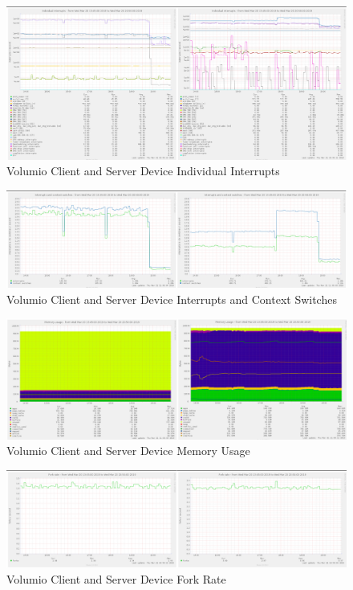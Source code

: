 \documentclass[11pt,a4paper,headinclude=false,footinclude=false]{scrreprt}
\begin{document}
\begin{figure}[H]
\includegraphics{ResultsAndAnalysis/VolumioServerTestImages/014VolumioIndividualInterrupts.png}
\centering
\caption{Volumio Client and Server Device Individual Interrupts}
\label{VolumioIndInt}
\end{figure}

\begin{figure}[H]
\includegraphics{ResultsAndAnalysis/VolumioServerTestImages/015VolumioInterruptsAndContextSwitches.png}
\centering
\caption{Volumio Client and Server Device Interrupts and Context Switches}
\label{VolumioIntCont}
\end{figure}

\begin{figure}[H]
\includegraphics{ResultsAndAnalysis/VolumioServerTestImages/017VolumioMemoryUsage.png}
\centering
\caption{Volumio Client and Server Device Memory Usage}
\label{VolumioMemUse}
\end{figure}

\begin{figure}[H]
\includegraphics{ResultsAndAnalysis/VolumioServerTestImages/013VolumioForkRate.png}
\centering
\caption{Volumio Client and Server Device Fork Rate}
\label{VolumioForkRate}
\end{figure}
\end{document}
